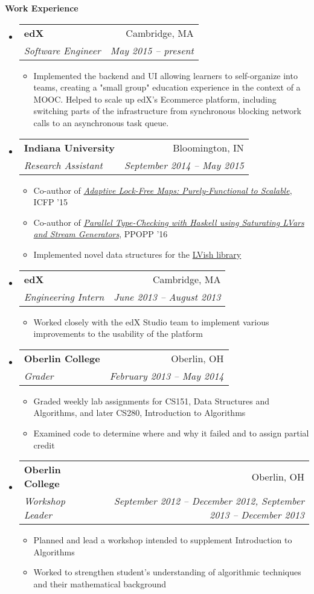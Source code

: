 \documentclass[letterpaper,11pt]{article}
\makeatletter
\newcommand{\resitem}[1]{\item #1 \vspace{-2pt}}
\newcommand{\resheading}[1]{{\large\colorbox{mygrey}{\begin{minipage}{\textwidth}{\textbf{#1\vphantom{p\^{E}}}}\end{minipage}}}}
\newcommand{\ressubheading}[4]{
  \begin{tabular*}{6.5in}{l@{\extracolsep{\fill}}r}
    \textbf{#1} & #2 \\
    \textit{#3} & \textit{#4} \\
  \end{tabular*}\vspace{-6pt}}
\makeatother
\begin{document}
\resheading{Work Experience}
\begin{itemize}
\item
  \ressubheading{edX}{Cambridge, MA}{Software Engineer}{May 2015 -- present}
  \begin{itemize}
  \resitem{Implemented the backend and UI allowing learners to self-organize into teams, creating a "small group" education experience in the context of a MOOC. Helped to scale up edX's Ecommerce platform, including switching parts of the infrastructure from synchronous blocking network calls to an asynchronous task queue.}
  \end{itemize}
\item
  \ressubheading{Indiana University}{Bloomington, IN}{Research Assistant}{September 2014 -- May 2015}
  \begin{itemize}
  \resitem{Co-author of \href{http://www.cs.indiana.edu/~rrnewton/papers/icfp15_adaptive_data.pdf}{\textit{Adaptive Lock-Free Maps: Purely-Functional to Scalable}}, ICFP '15}
  \resitem{Co-author of \href{https://dl.acm.org/citation.cfm?id=2851142}{\textit{Parallel Type-Checking with Haskell using Saturating LVars and Stream Generators}}, PPOPP '16}
  \resitem{Implemented novel data structures for the \href{http://github.com/iu-parfunc/lvars}{LVish library}}
  \end{itemize}
\item
  \ressubheading{edX}{Cambridge, MA}{Engineering Intern}{June 2013 -- August 2013}
  \begin{itemize}
  \resitem{Worked closely with the edX Studio team to implement various improvements to the usability of the platform}
  \end{itemize}
\item
  \ressubheading{Oberlin College}{Oberlin, OH}{Grader}{February 2013 -- May 2014}
  \begin{itemize}
    \resitem{Graded weekly lab assignments for CS151, Data Structures and Algorithms, and later CS280, Introduction to Algorithms}
    \resitem{Examined code to determine where and why it failed and to assign partial credit}
  \end{itemize}
\item
  \ressubheading{Oberlin College}{Oberlin, OH}{Workshop Leader}{September 2012 -- December 2012, September 2013 -- December 2013}
  \begin{itemize}
    \resitem{Planned and lead a workshop intended to supplement Introduction to Algorithms}
    \resitem{Worked to strengthen student's understanding of algorithmic techniques and their mathematical background}

\end{itemize}
\end{itemize}
\end{document}
